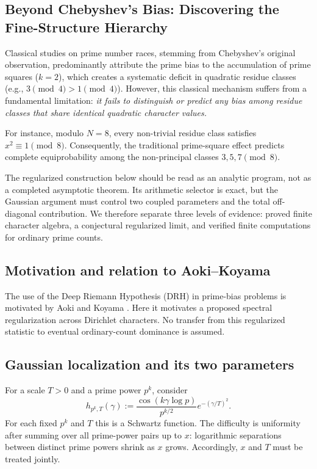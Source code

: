\documentclass[12pt,reqno]{amsart}
\theoremstyle{definition}
\theoremstyle{remark}
\numberwithin{equation}{section}
\begin{document}
\subsection{Beyond Chebyshev's Bias: Discovering the Fine-Structure Hierarchy}

Classical studies on prime number races, stemming from Chebyshev's original observation, predominantly attribute the prime bias to the accumulation of prime squares ($k=2$), which creates a systematic deficit in quadratic residue classes (e.g., $3 \pmod 4 > 1 \pmod 4$). However, this classical mechanism suffers from a fundamental limitation: \emph{it fails to distinguish or predict any bias among residue classes that share identical quadratic character values.}

For instance, modulo $N=8$, every non-trivial residue class satisfies $x^2 \equiv 1 \pmod 8$. Consequently, the traditional prime-square effect predicts complete equiprobability among the non-principal classes $3, 5, 7 \pmod 8$. 


The regularized construction below should be read as an analytic program,
not as a completed asymptotic theorem.  Its arithmetic selector is exact, but
the Gaussian argument must control two coupled parameters and the total
off-diagonal contribution.  We therefore separate three levels of evidence:
proved finite character algebra, a conjectural regularized limit, and verified
finite computations for ordinary prime counts.

\subsection{Motivation and relation to Aoki--Koyama}

The use of the Deep Riemann Hypothesis (DRH) in prime-bias problems is
motivated by Aoki and Koyama \cite{AK23}.  Here it motivates a proposed
spectral regularization across Dirichlet characters.  No transfer from this
regularized statistic to eventual ordinary-count dominance is assumed.

\subsection{Gaussian localization and its two parameters}

For a scale $T>0$ and a prime power $p^k$, consider
\begin{equation}
h_{p^k,T}(\gamma):=
 \frac{\cos(k\gamma\log p)}{p^{k/2}}
 e^{-(\gamma/T)^2}.
\end{equation}
For each fixed $p^k$ and $T$ this is a Schwartz function.  The difficulty is
uniformity after summing over all prime-power pairs up to $x$: logarithmic
separations between distinct prime powers shrink as $x$ grows.  Accordingly,
$x$ and $T$ must be treated jointly.
\end{document}
